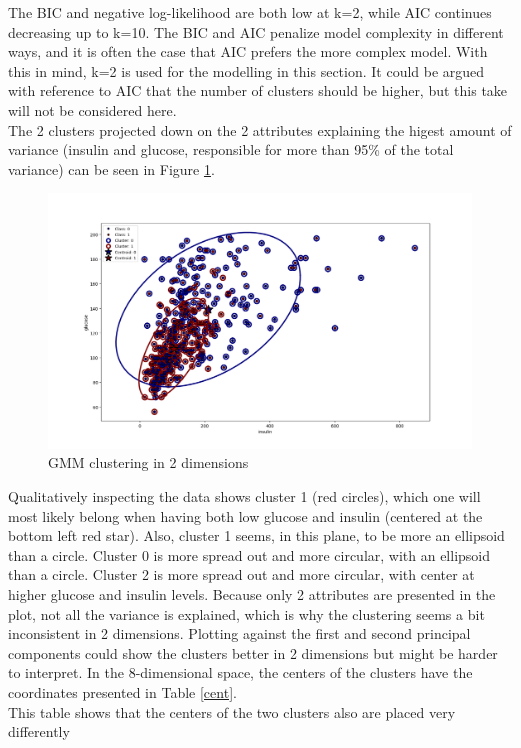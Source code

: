 The BIC and negative log-likelihood are both low at k=2, while AIC continues
decreasing up to k=10. The BIC and AIC penalize model complexity in different ways,
and it is often the case that AIC prefers the more complex model. With this in mind,
k=2 is used for the modelling in this section. It could be argued with reference to AIC
that the number of clusters should be higher, but this take will not be considered here.\\
The 2 clusters projected down on the 2 attributes explaining the higest amount
of variance (insulin and glucose, responsible for more than 95\% of the total
variance) can be seen in Figure \ref{gmm}.\\
\begin{figure}[htbp]
  \centering
  \includegraphics[width=\textwidth]{Figure_2.png}
  \caption{GMM clustering in 2 dimensions}
  \label{gmm}
\end{figure}
Qualitatively inspecting the data shows cluster 1 (red circles), which one
will most likely belong when having both low glucose and insulin (centered
at the bottom left red star). Also, cluster 1 seems, in this plane, to be more
an ellipsoid than a circle. Cluster 0 is more spread out and more circular, with
an ellipsoid than a circle. Cluster 2 is more spread out and more circular, with
center at higher glucose and insulin levels.
Because only 2 attributes are presented in the plot, not all the variance is
explained, which is why the clustering seems a bit inconsistent in 2 dimensions.
Plotting against the first and second principal components could show the clusters better
in 2 dimensions but might be harder to interpret. In the 8-dimensional space, the centers
of the clusters have the coordinates presented in Table \ref{cent}. \\
This table shows that the centers of the two clusters also are placed very differently

